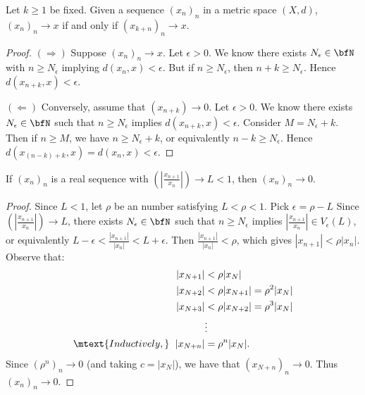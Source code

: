     \begin{proposition}
        Let $k\geq 1$ be fixed. Given a sequence $(x_n)_n$ in a metric space $(X,d)$, $(x_n)_n \rightarrow x$ if and only if $(x_{k+n})_n \rightarrow x$.
    \end{proposition}
        \begin{proof}
            $(\Rightarrow)$ Suppose $(x_n)_n \rightarrow x$. Let $\epsilon > 0$. We know there exists $N_\epsilon \in \bfN$ with $n\geq N_\epsilon$ implying $d(x_n,x) < \epsilon$. But if $n \geq N_\epsilon$, then $n+k \geq N_\epsilon$. Hence $d(x_{n+k},x) < \epsilon$.

            $(\Leftarrow)$ Conversely, assume that $(x_{n+k}) \rightarrow 0$. Let $\epsilon > 0$. We know there exists $N_\epsilon \in \bfN$ such that $n \geq N_\epsilon$ implies $d(x_{n+k},x) < \epsilon$. Consider $M = N_\epsilon + k$. Then if $n \geq M$, we have $n \geq N_\epsilon + k$, or equivalently $n- k \geq N_\epsilon$. Hence $d(x_{(n-k)+k},x) = d(x_n,x) < \epsilon$.
        \end{proof}

    \begin{proposition}
        If $(x_n)_n$ is a real sequence with $\left(\left|\frac{x_{n+1}}{x_n}\right|\right)\rightarrow L < 1$, then $(x_n)_n \rightarrow 0$.
    \end{proposition}
        \begin{proof}
            Since $L<1$, let $\rho$ be an number satisfying $L < \rho < 1$. Pick $\epsilon = \rho - L$ Since $\left(\left|\frac{x_{n+1}}{x_n}\right|\right)\rightarrow L$, there exists $N_\epsilon \in \bfN$ such that $n\geq N_\epsilon$ implies $\left|\frac{x_{n+1}}{x_n}\right| \in V_\epsilon(L)$, or equivalently $L - \epsilon < \frac{|x_{n+1}|}{|x_n|} < L + \epsilon$. Then $\frac{|x_{n+1}|}{|x_n|} < \rho$, which gives $|x_{n+1}| < \rho |x_n|$. Observe that:
                \begin{equation*}
                \begin{split}
                    |x_{N+1}| &< \rho|x_N|\\
                    |x_{N+2}| &< \rho|x_{N+1}| = \rho^2|x_{N}| \\
                    |x_{N+3}| &< \rho|x_{N+2}| = \rho^3|x_{N}| \\
                    &\vdots \\
                    \mtext{Inductively,}\hspace{6pt}|x_{N+n}| &= \rho^n|x_N|.
                \end{split}
                \end{equation*}
            Since $(\rho^n)_n \rightarrow 0$ (and taking $c = |x_N|$), we have that $(x_{N+n})_n \rightarrow 0$. Thus $(x_n)_n \rightarrow 0$.
        \end{proof}

